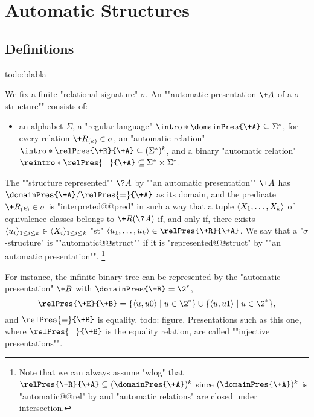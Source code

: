\section{Automatic Structures}
\label{sec:preliminaries-automatic-structures-automatic-structures}

\subsection{Definitions}
todo:blabla

We fix a finite "relational signature" $\sigma$.
An \AP""automatic presentation $\+A$ of a $\sigma$-structure"" consists of:
\begin{itemize}
	\item an alphabet $\Sigma$,
	\itemAP a "regular language" $\intro*\domainPres{\+A} \subseteq \Sigma^*$,
	\itemAP for every relation $\+R_{(k)} \in \sigma$, an
		"automatic relation" $\intro*\relPres{\+R}{\+A} \subseteq (\Sigma^*)^k$, and
	\itemAP a binary "automatic relation" $\reintro*\relPres{=}{\+A} \subseteq
		\Sigma^* \times \Sigma^*$. 
\end{itemize} 
The \AP""structure represented"" $\?A$ by ""an automatic presentation"" $\+A$ has
$\domainPres{\+A}/{\relPres{=}{\+A}}$ as its domain, and the predicate $\+R_{(k)} \in \sigma$
is "interpreted@@pred" in such a way that a tuple $\langle X_1,\hdots,X_k\rangle$ of equivalence classes
belongs to $\+R(\?A)$ if, and only if, there exists $\langle u_i\rangle_{1 \leq i \leq k} \in\langle X_i\rangle_{1 \leq i \leq k}$ "st" $\tup{u_1,\hdots,u_k} \in \relPres{\+R}{\+A}$.
We say that a "$\sigma$-structure" is ""automatic@@struct"" if it is
"represented@@struct" by ""an automatic presentation"".%
\footnote{Note that we can always assume "wlog" that $\relPres{\+R}{\+A} \subseteq
(\domainPres{\+A})^k$ since $(\domainPres{\+A})^k$ is "automatic@@rel" by
 and "automatic relations" are closed under intersection.}

For instance, the infinite binary tree can be represented by the "automatic presentation"
$\+B$ with $\domainPres{\+B} = \2^*$,
\[
	\relPres{\+E}{\+B} =
	\{\tup{u,u0} \mid u \in \2^*\} \cup \{\tup{u,u1} \mid u \in \2^*\},
\]
and $\relPres{=}{\+B}$ is equality.
todo: figure.
Presentations such as this one, where $\relPres{=}{\+B}$ is the equality relation,
are called ""injective presentations"".

